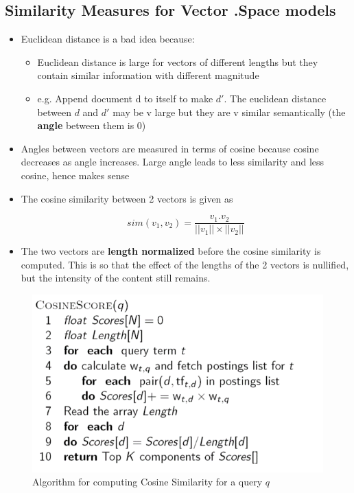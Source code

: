 \documentclass{article}
\begin{document}
\subsection{Similarity Measures for Vector .Space models}
\begin{itemize}
    \item Euclidean distance is a bad idea because:
    \begin{itemize}
        \item  Euclidean distance is large for vectors of different lengths but they contain similar information with different magnitude
        
        \item e.g. Append document d to itself to make $d'$. The euclidean distance between $d$ and $d'$ may be v large but they are v similar semantically (the \textbf{angle} between them is 0)
    \end{itemize}
    
    \item Angles between vectors are measured in terms of cosine because cosine decreases as angle increases. Large angle leads to less similarity and less cosine, hence makes sense
    
    \item The cosine similarity between 2 vectors is given as
    
    \begin{equation}
        sim(v_1, v_2) = \frac{v_1 . v_2}{||v_1|| \times ||v_2||}
    \end{equation}
     
    \item The two vectors are \textbf{length normalized} before the cosine similarity is computed. This is so that the effect of the lengths of the 2 vectors is nullified, but the intensity of the content still remains. 
\end{itemize}

\begin{figure}[!h]
    \centering
    \includegraphics[scale=0.6]{p1.png}
    \caption{Algorithm for computing Cosine Similarity for a query $q$}
    \label{fig:my_label_1}
\end{figure}
\end{document}
